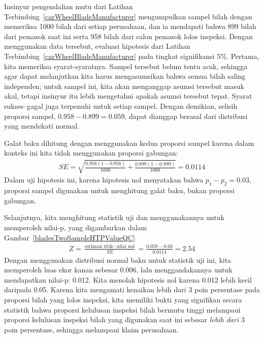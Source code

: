 \begin{examplewrap}
\begin{nexample}{Insinyur pengendalian mutu dari
    Latihan Terbimbing~\ref{carWheelBladeManufacturer}
    mengumpulkan sampel bilah dengan memeriksa 1000 bilah
    dari setiap perusahaan, dan ia mendapati bahwa 899 bilah dari
    pemasok saat ini serta 958 bilah dari calon pemasok lolos
    inspeksi.
    Dengan menggunakan data tersebut, evaluasi hipotesis dari
    Latihan Terbimbing~\ref{carWheelBladeManufacturer}
    pada tingkat signifikansi 5\%.}
  \label{qualityCtrlEngHypothesisEval}%
  Pertama, kita memeriksa syarat-syaratnya.
  Sampel tersebut belum tentu acak, sehingga agar dapat melanjutkan
  kita harus mengasumsikan bahwa semua bilah saling independen;
  untuk sampel ini, kita akan menganggap asumsi tersebut
  masuk akal, tetapi insinyur itu lebih mengetahui
  apakah asumsi tersebut tepat.
  Syarat sukses--gagal juga terpenuhi untuk setiap sampel.
  Dengan demikian, selisih proporsi sampel,
  $0.958 - 0.899 = 0.059$, dapat dianggap berasal dari distribusi
  yang mendekati normal.

  Galat baku dihitung dengan menggunakan kedua proporsi
  sampel karena dalam konteks ini kita tidak menggunakan
  proporsi gabungan:
  \begin{align*}
  SE
    = \sqrt{\frac{0.958(1-0.958)}{1000} +
        \frac{0.899(1-0.899)}{1000}}
    = 0.0114
  \end{align*}
  Dalam uji hipotesis ini, karena hipotesis nol menyatakan bahwa
  $p_1 - p_2 = 0.03$, proporsi sampel digunakan
  untuk menghitung galat baku, bukan proporsi
  gabungan.

  Selanjutnya, kita menghitung statistik uji dan menggunakannya untuk memperoleh
  nilai-p, yang digambarkan dalam
  Gambar~\ref{bladesTwoSampleHTPValueQC}.
  \begin{align*}
  Z = \frac{\text{estimasi titik} - \text{nilai nol}}{SE}
    = \frac{0.059 - 0.03}{0.0114} = 2.54
  \end{align*}
  Dengan menggunakan distribusi normal baku untuk statistik uji ini,
  kita memperoleh luas ekor kanan sebesar 0.006,
  lalu menggandakannya untuk mendapatkan nilai-p: 0.012.
  Kita menolak hipotesis nol karena 0.012 lebih kecil daripada 0.05.
  Karena kita mengamati kenaikan lebih dari 3 poin persentase pada proporsi bilah
  yang lolos inspeksi, kita memiliki bukti yang signifikan
  secara statistik bahwa proporsi kelulusan inspeksi bilah bermutu tinggi
  melampaui proporsi kelulusan inspeksi bilah yang digunakan saat ini
  sebesar \emph{lebih dari} 3 poin persentase, sehingga melampaui klaim perusahaan.
\end{nexample}
\end{examplewrap}

